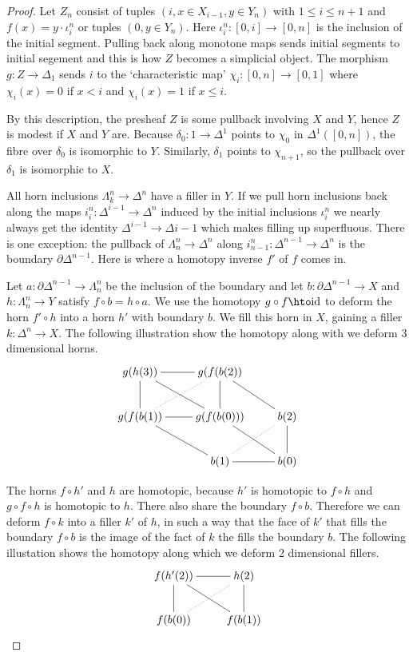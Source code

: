\documentclass{amsart}
\theoremstyle{plain}
\theoremstyle{definition}
\newcommand\id{\mathrm{id}}
\begin{document}
\begin{proof}
Let $Z_n$ consist of tuples $(i, x\in X_{i-1}, y\in Y_n)$ with $1\leq i\leq n+1$ and $f(x) = y\cdot \iota^n_i$ or tuples $(0,y\in Y_n)$. Here $\iota^n_i:[0,i] \to [0,n]$ is the inclusion of the initial segment. Pulling back along monotone maps sends initial segments to initial segement and this is how $Z$ becomes a simplicial object. The morphism $g:Z \to \Delta_1$ sends $i$ to the `characteristic map' $\chi_i:[0,n]\to[0,1]$ where $\chi_i(x) = 0$ if $x<i$ and $\chi_i(x) = 1$ if $x\leq i$.

By this description, the presheaf $Z$ is some pullback involving $X$ and $Y$, hence $Z$ is modest if $X$ and $Y$ are. Because $\delta_0: 1 \to \Delta^1$ points to $\chi_0$ in $\Delta^1([0,n])$, the fibre over $\delta_0$ is isomorphic to $Y$. Similarly, $\delta_1$ points to $\chi_{n+1}$, so the pullback over $\delta_1$ is isomorphic to $X$.

All horn inclusions $\Lambda^n_k \to \Delta^n$ have a filler in $Y$. If we pull horn inclusions back along the maps $i^n_i:\Delta^{i-1} \to \Delta^n$ induced by the initial inclusions $\iota^n_i$ we nearly always get the identity $\Delta^{i-1}\to\Delta{i-1}$ which makes filling up superfluous. There is one exception: the pullback of $\Lambda^n_n \to\Delta^n$ along $i^n_{n-1}:\Delta^{n-1}\to\Delta^n$ is the boundary $\partial\Delta^{n-1}$. Here is where a homotopy inverse $f'$ of $f$ comes in.

Let $a:\partial\Delta^{n-1} \to \Lambda_n^n$ be the inclusion of the boundary and let $b:\partial\Delta^{n-1}\to X$ and $h:\Lambda^n_n \to Y$ satisfy $f\circ b = h\circ a$. We use the homotopy $g\circ f \hto \id$ to deform the horn $f'\circ h$ into a horn $h'$ with boundary $b$. We fill this horn in $X$, gaining a filler $k:\Delta^n \to X$. The following illustration show the homotopy along with we deform 3 dimensional horns.
\[ \xymatrix{
g(h(3)) \ar@{-}[r]\ar@{-}[dr]\ar@{-}[d] & g(f(b(2)) \ar@{-}[dr]\ar@{-}[d] \\
g(f(b(1))\ar@{-}[dr]\ar@{.}[ur]\ar@{-}[r] & g(f(b(0))) \ar@{-}[dr] & b(2)\ar@{-}[d]\\
& b(1) \ar@{-}[r]\ar@{.}[ur] & b(0)
} \]

The horns $f\circ h'$ and $h$ are homotopic, because $h'$ is homotopic to $f\circ h$ and $g\circ f \circ h$ is homotopic to $h$. There also share the boundary $f\circ b$. Therefore we can deform $f\circ k$ into a filler $k'$ of $h$, in such a way that the face of $k'$ that fills the boundary $f\circ b$ is the image of the fact of $k$ the fills the boundary $b$. The following illustation shows the homotopy along which we deform 2 dimensional fillers.
\[ \xymatrix{
f(h'(2)) \ar@{-}[r]\ar@{-}[dr]\ar@{-}[d] & h(2)\ar@{-}[d] \\
f(b(0))\ar@{.}[ur] & f(b(1))
}\]
\end{proof}
\end{document}
